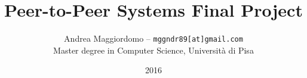 \documentclass[a4paper, 12pt]{article}
\title{Peer-to-Peer Systems Final Project}
\author{Andrea Maggiordomo -- \texttt{mggndr89[at]gmail.com} \\[1mm] Master degree in Computer Science, Universit\`a di Pisa}
\date{2016}
\begin{document}


\maketitle









{}
\end{document}
